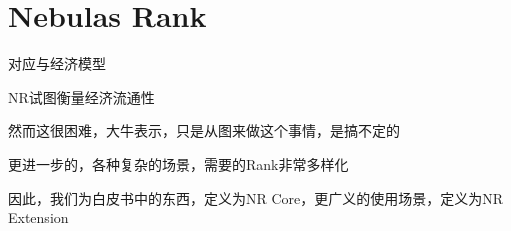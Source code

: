 \section{Nebulas Rank}
对应与经济模型

NR试图衡量经济流通性

然而这很困难，大牛表示，只是从图来做这个事情，是搞不定的

更进一步的，各种复杂的场景，需要的Rank非常多样化

因此，我们为白皮书中的东西，定义为NR Core，更广义的使用场景，定义为NR Extension
